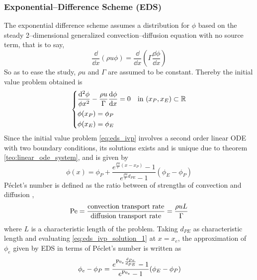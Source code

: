 \subsubsection{Exponential--Difference Scheme (EDS)}

The exponential difference scheme assumes a distribution for $\phi$ based on the
steady 2--dimensional generalized convection--diffusion equation with no source
term, that is to say,
\begin{equation*}
	\frac{\dd}{\dd{x}} (\rho u \phi) = \frac{\dd}{\dd{x}} \left( \Gamma \frac{\dd{\phi}}{\dd{x}} \right)
\end{equation*}
So as to ease the
study, $\rho u$ and $\Gamma$ are assumed to be constant. Thereby the initial
value problem obtained is
\begin{equation} \label{eq:eds_ivp}
	\left\{
	\begin{aligned}
		&\frac{\dd^2 \phi}{\phi{x^2}} - \frac{\rho u}{\Gamma} \frac{\dd{\phi}}{\dd{x}} = 0 & &\text{in } (x_P, x_E) \subset \mathbb{R} \\
		&\phi(x_P) = \phi_P \\
		&\phi(x_E) = \phi_E \\
	\end{aligned}
	\right.
\end{equation}
Since the initial value problem \eqref{eq:eds_ivp} involves a second order
linear ODE with two boundary conditions, its solutions exists and is unique due
to theorem \ref{teo:linear_ode_system}, and is given by
\begin{equation} \label{eq:eds_ivp_solution_1}
	\phi(x) = 
	\phi_P +
	\frac{e^{\frac{\rho u}{\Gamma} (x - x_P)} - 1}{e^{\frac{\rho u}{\Gamma} d_{PE}} - 1} (\phi_E - \phi_P)
\end{equation}
Péclet's number is defined as the ratio between of strengths of convection
and diffusion \cite{patankar2008numerical},
\begin{equation*}
	\mathrm{Pe} = 
	\frac{\text{convection transport rate}}{\text{diffusion transport rate}} = 
	\frac{\rho u L}{\Gamma}
\end{equation*}
where $L$ is a characteristic length of the problem. Taking $d_{PE}$ as characteristic length and evaluating
\eqref{eq:eds_ivp_solution_1} at $x = x_e$, the approximation of $\phi_e$ given
by EDS in terms of Péclet's number is written as
\begin{equation} \label{eq:eds_e}
	\phi_e - \phi_P = 
	\frac{e^{\mathrm{Pe}_e \frac{d_{Pe}}{d_{PE}}} - 1}{e^{\mathrm{Pe}_e} - 1} (\phi_E - \phi_P)
\end{equation}

